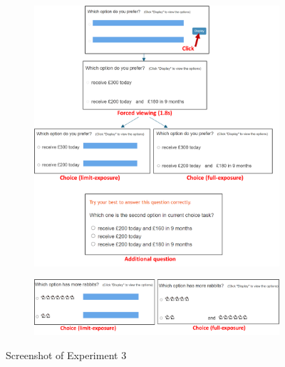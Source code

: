\documentclass[
  12pt,
]{article}
\begin{document}
\begin{figure}
  \centering
  \begin{subfigure}{\textwidth}
    \centering
    \includegraphics[width=\linewidth]{figures/exp3_intertemporal_task.png}
  \end{subfigure}
  \begin{subfigure}{\textwidth}
    \vspace{2.5em}
    \centering
    \includegraphics[width=\linewidth]{figures/exp3_rabbit_task.png}
  \end{subfigure}
  \caption{Screenshot of Experiment 3}
  \label{fig:exp3_screenshot}
\end{figure}
\end{document}
